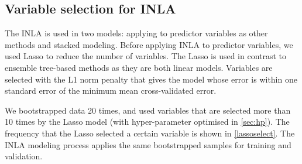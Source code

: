 \documentclass{article}
\begin{document}
\subsection{Variable selection for INLA} 

The INLA is used in two models:  applying to predictor variables as other methods and stacked modeling. Before applying INLA to predictor variables, we used Lasso to reduce the number of variables. The Lasso is used in contrast to ensemble tree-based methods as they are both linear models. 
Variables are selected with the L1 norm penalty that gives the model whose error is within one standard error of the minimum mean cross-validated error.

We bootstrapped data 20 times, and used variables that are selected more than 10 times by the Lasso model (with hyper-parameter optimised in \cref{sec:hp}). The frequency that the Lasso selected a certain variable is shown in \cref{lassoselect}. The INLA modeling process applies the same bootstrapped samples for training and validation. 
\end{document}
